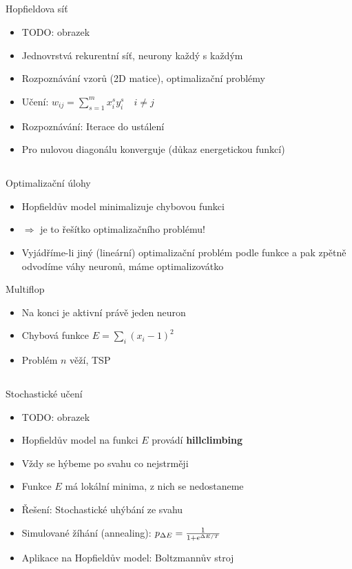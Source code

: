 \documentclass{beamer}
\begin{document}
\subsection{}
\begin{frame}{Hopfieldova síť}
\begin{itemize}
\item TODO: obrazek
\item Jednovrstvá rekurentní síť, neurony každý s každým
\item Rozpoznávání vzorů (2D matice), optimalizační problémy
\item Učení: $w_{ij} = \sum_{s=1}^m x_i^s y_i^s\quad i \ne j$
\item Rozpoznávání: Iterace do ustálení
\item Pro nulovou diagonálu konverguje (důkaz energetickou funkcí)
\end{itemize}
\end{frame}

\subsection{}
\begin{frame}{Optimalizační úlohy}
\begin{itemize}
\item Hopfieldův model minimalizuje chybovou funkci
\item $\Rightarrow$ je to řešítko optimalizačního problému!
\item Vyjádříme-li jiný (lineární) optimalizační problém podle funkce a pak zpětně odvodíme váhy neuronů, máme optimalizovátko
\end{itemize}
\begin{block}{Multiflop}
\begin{itemize}
\item Na konci je aktivní právě jeden neuron
\item Chybová funkce $E = \sum_i (x_i-1)^2$
\item Problém $n$ věží, TSP
\end{itemize}
\end{block}
\end{frame}

\subsection{}
\begin{frame}{Stochastické učení}
\begin{itemize}
\item TODO: obrazek
\item Hopfieldův model na funkci $E$ provádí {\bf hillclimbing}
\item Vždy se hýbeme po svahu co nejstrměji
\item Funkce $E$ má lokální minima, z nich se nedostaneme
\item Řešení: Stochastické uhýbání ze svahu
\item Simulované žíhání (annealing): $p_{\Delta E} = {1 \over 1 + e^{\Delta E/T}}$
\item Aplikace na Hopfieldův model: Boltzmannův stroj
\end{itemize}
\end{frame}
\end{document}
